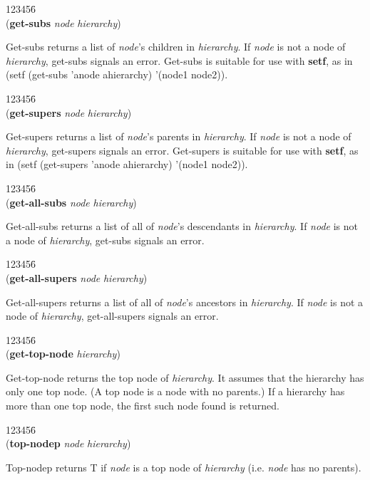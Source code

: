 \begin{tabbing}
123456\= \kill
\\
({\bf get-subs} {\it node} {\it hierarchy\/}) 
\end{tabbing}
Get-subs returns a list of {\it node\/}'s children in {\it hierarchy}.
If {\it node} is not a node of {\it hierarchy\/}, get-subs signals an
error. Get-subs is suitable for use with {\bf setf}, as in (setf
(get-subs 'anode ahierarchy) '(node1 node2)).


\begin{tabbing}
123456\= \kill
\\
({\bf get-supers} {\it node} {\it hierarchy\/}) 
\end{tabbing}
Get-supers returns a list of {\it node\/}'s parents in {\it
hierarchy}.  If {\it node} is not a node of {\it hierarchy\/},
get-supers signals an error. Get-supers is suitable for use with {\bf
setf}, as in (setf (get-supers 'anode ahierarchy) '(node1 node2)).


\begin{tabbing}
123456\= \kill
\\
({\bf get-all-subs} {\it node} {\it hierarchy\/}) 
\end{tabbing}
Get-all-subs returns a list of all of {\it node\/}'s descendants in
{\it hierarchy}.  If {\it node} is not a node of {\it hierarchy\/},
get-subs signals an error.

\begin{tabbing}
123456\= \kill
\\
({\bf get-all-supers} {\it node} {\it hierarchy\/}) 
\end{tabbing}
Get-all-supers returns a list of all of {\it node\/}'s ancestors in {\it
hierarchy}.  If {\it node} is not a node of {\it hierarchy\/},
get-all-supers signals an error. 


\begin{tabbing}
123456\= \kill
\\
({\bf get-top-node} {\it hierarchy\/}) 
\end{tabbing}
Get-top-node returns the top node of {\it hierarchy\/}. It assumes
that the hierarchy has only one top node. (A top node is a node with
no parents.) If a hierarchy has more than one top node, the first such
node found is returned.


\begin{tabbing}
123456\= \kill
\\
({\bf top-nodep} {\it node} {\it hierarchy\/}) 
\end{tabbing}
Top-nodep returns T if {\it node} is a top node of {\it hierarchy}
(i.e. {\it node} has no parents).

